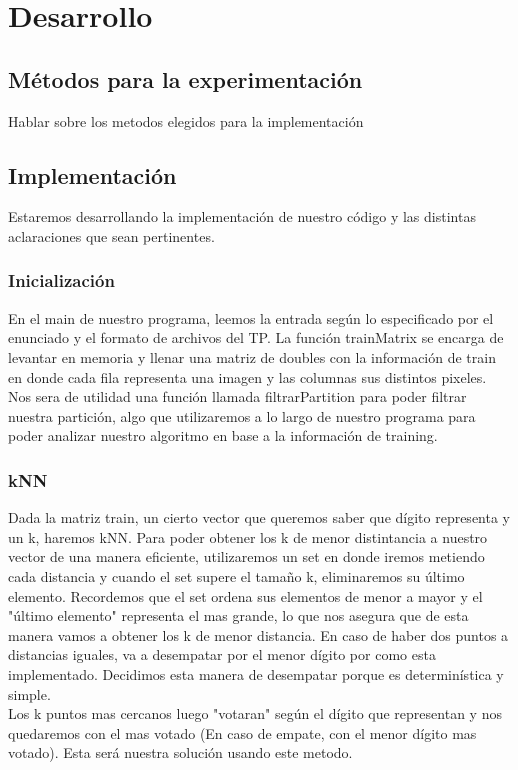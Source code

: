 \section{Desarrollo}

\subsection{M\'etodos para la experimentaci\'on}

Hablar sobre los metodos elegidos para la implementaci\'on

\subsection{Implementaci\'on}

Estaremos desarrollando la implementaci\'on de nuestro c\'odigo y las distintas aclaraciones que sean pertinentes.

\subsubsection{Inicializaci\'on}

En el main de nuestro programa, leemos la entrada seg\'un lo especificado por el enunciado y el formato de archivos del TP. La funci\'on trainMatrix se encarga de levantar en memoria y llenar una matriz de doubles con la informaci\'on de train en donde cada fila representa una imagen y las columnas sus distintos pixeles. \\
Nos sera de utilidad una funci\'on llamada filtrarPartition para poder filtrar nuestra partici\'on, algo que utilizaremos a lo largo de nuestro programa para poder analizar nuestro algoritmo en base a la informaci\'on de training.

\subsubsection{kNN}

Dada la matriz train, un cierto vector que queremos saber que d\'igito representa y un k, haremos kNN. Para poder obtener los k de menor distintancia a nuestro vector de una manera eficiente, utilizaremos un set en donde iremos metiendo cada distancia y cuando el set supere el tama\~no k, eliminaremos su \'ultimo elemento. Recordemos que el set ordena sus elementos de menor a mayor y el "\'ultimo elemento" representa el mas grande, lo que nos asegura que de esta manera vamos a obtener los k de menor distancia. En caso de haber dos puntos a distancias iguales, va a desempatar por el menor d\'igito por como esta implementado. Decidimos esta manera de desempatar porque es determin\'istica y simple.\\
Los k puntos mas cercanos luego "votaran" seg\'un el d\'igito que representan y nos quedaremos con el mas votado (En caso de empate, con el menor d\'igito mas votado). Esta ser\'a nuestra soluci\'on usando este metodo.

